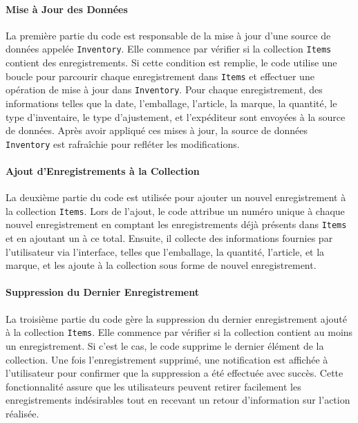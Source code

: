 \documentclass[a4paper, oneside, 12pt, final]{extreport}
\begin{document}
\paragraph{Mise à Jour des Données}
La première partie du code est responsable de la mise à jour d'une source de données appelée \texttt{Inventory}. Elle commence par vérifier si la collection \texttt{Items} contient des enregistrements. Si cette condition est remplie, le code utilise une boucle pour parcourir chaque enregistrement dans \texttt{Items} et effectuer une opération de mise à jour dans \texttt{Inventory}. Pour chaque enregistrement, des informations telles que la date, l'emballage, l'article, la marque, la quantité, le type d'inventaire, le type d'ajustement, et l'expéditeur sont envoyées à la source de données. Après avoir appliqué ces mises à jour, la source de données \texttt{Inventory} est rafraîchie pour refléter les modifications.

\paragraph{Ajout d'Enregistrements à la Collection}
La deuxième partie du code est utilisée pour ajouter un nouvel enregistrement à la collection \texttt{Items}. Lors de l'ajout, le code attribue un numéro unique à chaque nouvel enregistrement en comptant les enregistrements déjà présents dans \texttt{Items} et en ajoutant un à ce total. Ensuite, il collecte des informations fournies par l'utilisateur via l'interface, telles que l'emballage, la quantité, l'article, et la marque, et les ajoute à la collection sous forme de nouvel enregistrement.

\paragraph{Suppression du Dernier Enregistrement}
La troisième partie du code gère la suppression du dernier enregistrement ajouté à la collection \texttt{Items}. Elle commence par vérifier si la collection contient au moins un enregistrement. Si c'est le cas, le code supprime le dernier élément de la collection. Une fois l'enregistrement supprimé, une notification est affichée à l'utilisateur pour confirmer que la suppression a été effectuée avec succès. Cette fonctionnalité assure que les utilisateurs peuvent retirer facilement les enregistrements indésirables tout en recevant un retour d'information sur l'action réalisée.
\end{document}
